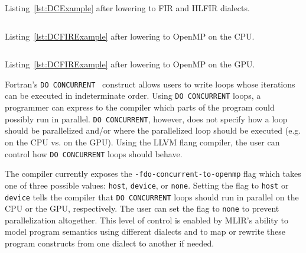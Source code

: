 \documentclass[acmtog,natbib=false]{acmart}
\newcommand{\code}[1]{\texttt{#1}\xspace}
\begin{document}
\begin{listing}[t]
\inputminted{MLIR-lexer.py:MlirLexer -x}{code/dc_fir.mlir}
\caption{Listing~\ref{lst:DCExample} after lowering to \ac{FIR} and \ac{HLFIR} dialects.}
\label{lst:DCFIRExample}
\end{listing}

\begin{listing}[t]
\inputminted{MLIR-lexer.py:MlirLexer -x}{code/dc_omp.mlir}
\caption{Listing~\ref{lst:DCFIRExample} after lowering to OpenMP on the CPU.}
\label{lst:DCOMPExample}
\end{listing}

\begin{listing}[t]
\inputminted{MLIR-lexer.py:MlirLexer -x}{code/dc_omp_device.mlir}
\caption{Listing~\ref{lst:DCFIRExample} after lowering to OpenMP on the GPU.}
\label{lst:DCOMPDeviceExample}
\end{listing}

Fortran's \code{DO CONCURRENT}~\cite{F2023} construct allows users to write loops whose iterations can be executed in indeterminate order.
Using \code{DO CONCURRENT} loops, a programmer can express to the compiler which parts of the program could possibly run in parallel.
\code{DO CONCURRENT}, however, does not specify how a loop should be parallelized and/or where the parallelized loop should be executed (e.g. on the CPU vs. on the GPU).
Using the LLVM flang compiler, the user can control how \code{DO CONCURRENT} loops should behave.

The compiler currently exposes the \code{-fdo-concurrent-to-openmp} flag which takes one of three possible values: \code{host}, \code{device}, or \code{none}.
Setting the flag to \code{host} or \code{device} tells the compiler that \code{DO CONCURRENT} loops should run in parallel on the CPU or the GPU, respectively.
The user can set the flag to \code{none} to prevent parallelization altogether.
This level of control is enabled by \ac{MLIR}'s ability to model program semantics using different dialects and to map or rewrite these program constructs from one dialect to another if needed.
\end{document}
